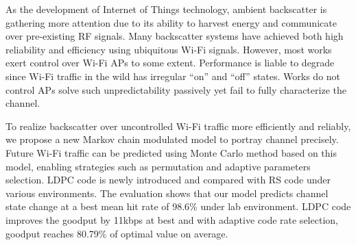 \begin{enabstract}
%
As the development of Internet of Things technology, ambient backscatter is gathering more attention due to its ability to harvest energy and communicate over pre-existing RF signals.
Many backscatter systems have achieved both high reliability and efficiency using ubiquitous Wi-Fi signals. However, most works exert control over Wi-Fi APs to some extent. Performance is liable to degrade since Wi-Fi traffic in the wild has irregular “on” and “off” states. Works do not control APs solve such unpredictability passively yet fail to fully characterize the channel.

To realize backscatter over uncontrolled Wi-Fi traffic more efficiently and reliably, we propose a new Markov chain modulated model to portray channel precisely. Future Wi-Fi traffic can be predicted using Monte Carlo method based on this model, enabling strategies such as permutation and adaptive parameters selection. LDPC code is newly introduced and compared with RS code under various environments. The evaluation shows that our model predicts channel state change at a best mean hit rate of 98.6\% under lab environment. LDPC code improves the goodput by 11kbps at best and with adaptive code rate selection, goodput reaches 80.79\% of optimal value on average.
\end{enabstract}
